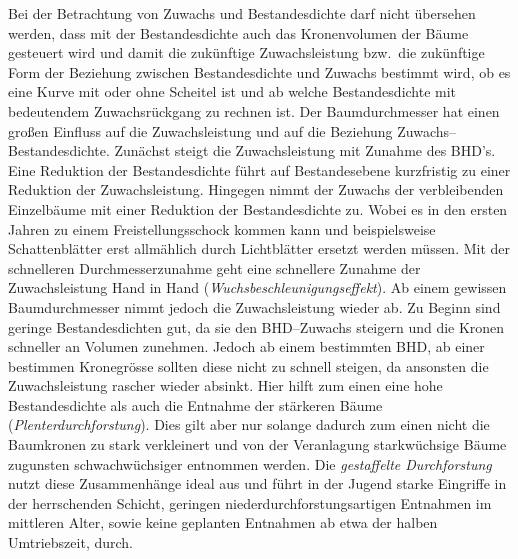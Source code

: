 \documentclass[twocolumn]{scrartcl}
\begin{document}
Bei der Betrachtung von Zuwachs und Bestandesdichte darf nicht übersehen werden,
dass mit der Bestandesdichte auch das Kronenvolumen der Bäume gesteuert wird und
damit die zukünftige Zuwachsleistung bzw.\ die zukünftige Form der Beziehung
zwischen Bestandesdichte und Zuwachs bestimmt wird, ob es eine Kurve mit oder
ohne Scheitel ist und ab welche Bestandesdichte mit bedeutendem Zuwachsrückgang
zu rechnen ist. Der Baumdurchmesser hat einen großen Einfluss auf die
Zuwachsleistung und auf die Beziehung Zuwachs--Bestandesdichte. Zunächst steigt
die Zuwachsleistung mit Zunahme des BHD's. Eine Reduktion der Bestandesdichte
führt auf Bestandesebene kurzfristig zu einer Reduktion der Zuwachsleistung.
Hingegen nimmt der Zuwachs der verbleibenden Einzelbäume mit einer Reduktion der
Bestandesdichte zu. Wobei es in den ersten Jahren zu einem Freistellungsschock
kommen kann und beispielsweise Schattenblätter erst allmählich durch
Lichtblätter ersetzt werden müssen. Mit der schnelleren Durchmesserzunahme geht
eine schnellere Zunahme der Zuwachsleistung Hand in Hand
(\emph{Wuchsbeschleunigungseffekt}). Ab einem
gewissen Baumdurchmesser nimmt jedoch die Zuwachsleistung wieder ab. Zu Beginn
sind geringe Bestandesdichten gut, da sie den BHD--Zuwachs steigern und die
Kronen schneller an Volumen zunehmen. Jedoch ab einem bestimmten BHD, ab einer
bestimmen Kronegrösse sollten diese nicht zu schnell steigen, da ansonsten die
Zuwachsleistung rascher wieder absinkt. Hier hilft zum einen eine hohe
Bestandesdichte als auch die Entnahme der stärkeren Bäume
(\emph{Plenterdurchforstung}). Dies gilt aber nur
solange dadurch zum einen nicht die Baumkronen zu stark verkleinert und von der
Veranlagung starkwüchsige Bäume zugunsten schwachwüchsiger entnommen werden. Die
\emph{gestaffelte Durchforstung} nutzt diese
Zusammenhänge ideal aus und führt in der Jugend starke Eingriffe in der
herrschenden Schicht, geringen niederdurchforstungsartigen Entnahmen im
mittleren Alter, sowie keine geplanten Entnahmen ab etwa der halben
Umtriebszeit, durch.
\end{document}
